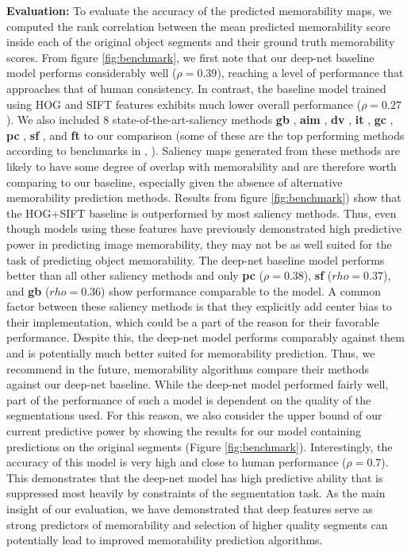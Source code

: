 \textbf{Evaluation: } To evaluate the accuracy of the predicted memorability maps, we computed the rank correlation between the mean predicted memorability score inside each of the original object segments and their ground truth memorability scores. From figure \ref{fig:benchmark}, we first note that our deep-net baseline model performs considerably well ($\rho = 0.39$), reaching a level of performance that approaches  that of human consistency. In contrast, the baseline model trained using HOG and SIFT features exhibits much lower overall performance ($\rho = 0.27$). We also included $8$ state-of-the-art-saliency methods \textbf{gb} \cite{gb}, \textbf{aim} \cite{aim}, \textbf{dv} \cite{dv}, \textbf{it} \cite{it}, \textbf{gc} \cite{gc}, \textbf{pc} \cite{pc}, \textbf{sf} \cite{sf}, and \textbf{ft} \cite{ft} to our comparison (some of these are the top performing methods according to benchmarks in \cite{borji13}, \cite{borji12}). Saliency maps generated from these methods are likely to have some degree of overlap with memorability and are therefore worth comparing to our baseline, especially given the absence of alternative memorability prediction methods. Results from figure \ref{fig:benchmark}) show that the HOG+SIFT baseline is outperformed by most saliency methods. Thus, even though models using these features have previously demonstrated high predictive power in predicting image memorability, they may not be as well  suited for the task of predicting object memorability. The deep-net baseline model performs better than all other saliency methods and only \textbf{pc} ($\rho=0.38$), \textbf{sf} ($rho=0.37$), and \textbf{gb} ($rho=0.36$) show performance comparable to the model. A common factor between these saliency methods is that they explicitly add center bias to their implementation, which could be a  part of the reason for their favorable performance. Despite this, the deep-net model performs comparably against them and is potentially much better suited for memorability prediction. Thus, we recommend in the future, memorability algorithms compare their methods against our deep-net baseline. While the deep-net model performed fairly well, part of the performance of such a model is dependent on the quality of the segmentations used. For this reason, we also consider the upper bound of our current predictive power by showing the results for our model containing predictions on the original segments (Figure \ref{fig:benchmark}). Interestingly, the accuracy of this model is very high and close to human performance ($\rho = 0.7$). This demonstrates that the deep-net model has high predictive ability that is suppressed most heavily by constraints of the segmentation task. As the main insight of our evaluation, we have demonstrated that deep features serve as strong predictors of memorability and selection of higher quality segments can potentially lead to improved memorability prediction algorithms.


